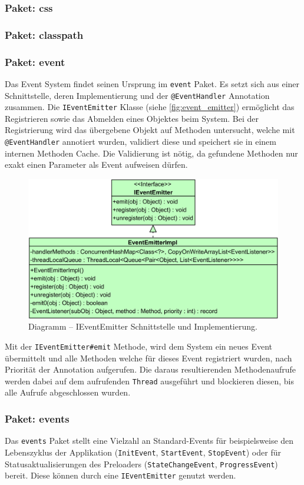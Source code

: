\subsubsection{Paket: css}
\subsubsection{Paket: classpath}
\subsubsection{Paket: event}
Das Event System findet seinen Ursprung im \texttt{event} Paket. Es setzt sich aus einer Schnittstelle, deren Implementierung und der \texttt{@EventHandler} Annotation zusammen. Die \texttt{IEventEmitter} Klasse (siehe \autoref{fig:event_emitter}) ermöglicht das Registrieren sowie das Abmelden eines Objektes beim System. Bei der Registrierung wird das übergebene Objekt auf Methoden untersucht, welche mit \texttt{@EventHandler} annotiert wurden, validiert diese und speichert sie in einem internen Methoden Cache. Die Validierung ist nötig, da gefundene Methoden nur exakt einen Parameter als Event aufweisen dürfen. 
\begin{figure}[H]
	\centering
	\includegraphics[width=\textwidth-4cm]{Abbildungen/EventEmitter.png}
	\caption{Diagramm -- IEventEmitter Schnittstelle und Implementierung.}
	\label{fig:event_emitter}
\end{figure}
\noindent Mit der \texttt{IEventEmitter\#emit} Methode, wird dem System ein neues Event übermittelt und alle Methoden welche für dieses Event registriert wurden, nach Priorität der Annotation aufgerufen. Die daraus resultierenden Methodenaufrufe werden dabei auf dem aufrufenden \texttt{Thread} ausgeführt und blockieren diesen, bis alle Aufrufe abgeschlossen wurden.
\subsubsection{Paket: events}
Das \texttt{events} Paket stellt eine Vielzahl an Standard-Events für beispielsweise den Lebenszyklus der Applikation (\texttt{InitEvent}, \texttt{StartEvent}, \texttt{StopEvent}) oder für Statusaktualisierungen des Preloaders (\texttt{StateChangeEvent}, \texttt{ProgressEvent}) bereit. Diese können durch eine \texttt{IEventEmitter} genutzt werden.
